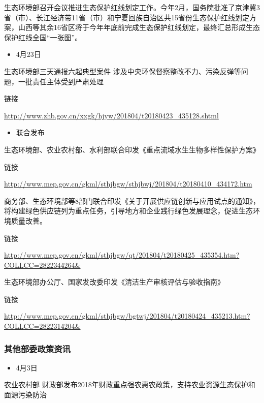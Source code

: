 \documentclass[]{book}
\providecommand{\tightlist}{%
  \setlength{\itemsep}{0pt}\setlength{\parskip}{0pt}}
\begin{document}
生态环境部召开会议推进生态保护红线划定工作。今年2月，国务院批准了京津冀3省（市）、长江经济带11省（市）和宁夏回族自治区共15省份生态保护红线划定方案，山西等其余16省区将于今年年底前完成生态保护红线划定，最终汇总形成生态保护红线全国``一张图''。

\begin{itemize}
\tightlist
\item
  4月23日
\end{itemize}

生态环境部三天通报六起典型案件 涉及中央环保督察整改不力、污染反弹等问题，一批责任主体受到严肃处理

链接

\url{http://www.zhb.gov.cn/xxgk/hjyw/201804/t20180423_435128.shtml}

\begin{itemize}
\tightlist
\item
  联合发布
\end{itemize}

生态环境部、农业农村部、水利部联合印发《重点流域水生生物多样性保护方案》

链接

\url{http://www.mep.gov.cn/gkml/sthjbgw/sthjbwj/201804/t20180410_434172.htm}

商务部、生态环境部等8部门联合印发《关于开展供应链创新与应用试点的通知》，将构建绿色供应链列为重点任务，引导地方和企业践行绿色发展理念，促进生态环境质量改善。

链接

\url{http://www.mep.gov.cn/gkml/sthjbgw/qt/201804/t20180425_435354.htm?COLLCC=2822344264\&}

生态环境部办公厅、国家发改委印发《清洁生产审核评估与验收指南》

链接

\url{http://www.mep.gov.cn/gkml/sthjbgw/bgtwj/201804/t20180424_435213.htm?COLLCC=2822314204\&}

\hypertarget{ux5176ux4ed6ux90e8ux59d4ux653fux7b56ux8d44ux8baf}{%
\subsubsection*{其他部委政策资讯}\label{ux5176ux4ed6ux90e8ux59d4ux653fux7b56ux8d44ux8baf}}

\begin{itemize}
\tightlist
\item
  4月3日
\end{itemize}

农业农村部 财政部发布2018年财政重点强农惠农政策，支持农业资源生态保护和面源污染防治
\end{document}
